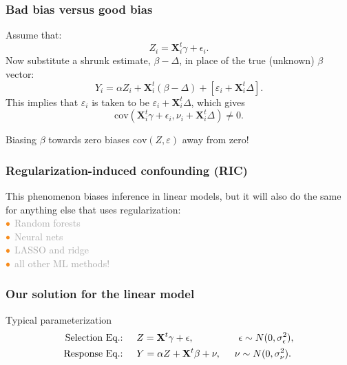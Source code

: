\documentclass{beamer}
\newcommand{\X}{\mathbf{X}}
\newcommand{\bo}[1]{\textcolor{burntorange}{#1}}
\newcommand{\dg}[1]{\textcolor{darkgray}{#1}}
\newcommand{\sk}{\vspace{.5cm}}
\newcommand{\sko}{\vspace{.1in}}
\begin{document}
\begin{frame}
\frametitle{Bad bias versus good bias}
Assume that:
\begin{equation*}
	Z_i = \X_i^t\gamma + \epsilon_i.
\end{equation*}
\vfill
Now substitute a shrunk estimate, $\beta - \Delta$, in place of the true (unknown) $\beta$ vector:\sko
\begin{equation*} 
	Y_{i} = \alpha Z_{i} + \X_{i}^t(\beta - \Delta) + [\varepsilon_{i} + \X_{i}^t\Delta].
\end{equation*}\sko
This implies that $\varepsilon_{i}$ is taken to be $\varepsilon_{i} + \X_i^t\Delta$, which gives \sko
$$\mbox{cov}{( \X_i^t\gamma + \epsilon_i, \nu_{i} + \X_{i}^t\Delta)} \neq 0.$$ 

\sko
Biasing $\beta$ towards zero biases $\mbox{cov}(Z, \varepsilon)$ \bo{away from zero!}
\end{frame}

\begin{frame}
	\frametitle{Regularization-induced confounding (RIC)}
	
	This phenomenon biases inference in linear models, but it will also do the same  for anything else that uses regularization: \\\sk  
\small	
	$\bo{\bullet}$ \dg{Random forests}\\
	$\bo{\bullet}$ \dg{Neural nets}\\
	$\bo{\bullet}$ \dg{LASSO and ridge}\\
	$\bo{\bullet}$ \dg{all other ML methods!}\\
	
	
	 
\end{frame}


\begin{frame}
\frametitle{Our solution for the linear model}
\sk
\bo{Typical parameterization}
\begin{equation*}
	\begin{split}
	\text{Selection Eq.:} &\hspace{5mm}	Z = \X^t\gamma + \epsilon, \hspace{16.3mm} \epsilon \sim N(0,\sigma_{\epsilon}^{2}), 
		\\
		\text{Response Eq.:} &\hspace{5mm}	Y = \alpha Z + \X^t\beta + \nu, \hspace{5mm} \nu \sim N(0,\sigma_{\nu}^{2}).
	\end{split}
\end{equation*}
\end{frame}
\end{document}
